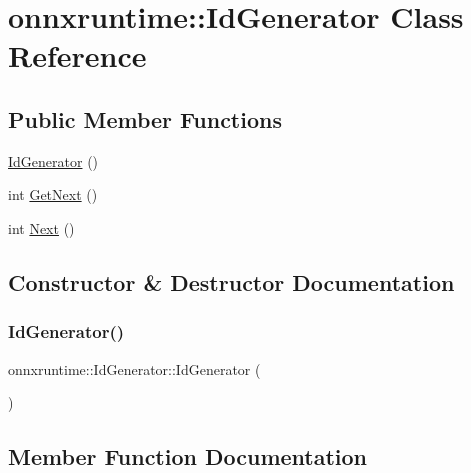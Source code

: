 \hypertarget{classonnxruntime_1_1IdGenerator}{}\section{onnxruntime\+:\+:Id\+Generator Class Reference}
\label{classonnxruntime_1_1IdGenerator}
\subsection*{Public Member Functions}
\begin{DoxyCompactItemize}
\item 
\mbox{\hyperlink{classonnxruntime_1_1IdGenerator_aabeac2f9870fd0681b0589e3dd372e02}{Id\+Generator}} ()
\item 
int \mbox{\hyperlink{classonnxruntime_1_1IdGenerator_acbb0d316a92bad0ffbf10cd3c94c9a2c}{Get\+Next}} ()
\item 
int \mbox{\hyperlink{classonnxruntime_1_1IdGenerator_ae63c5ab71bee8896bf5ebcac6dbfb08a}{Next}} ()
\end{DoxyCompactItemize}


\subsection{Constructor \& Destructor Documentation}
\mbox{\label{classonnxruntime_1_1IdGenerator_aabeac2f9870fd0681b0589e3dd372e02}} 
\subsubsection{\texorpdfstring{Id\+Generator()}{IdGenerator()}}
{\footnotesize\ttfamily onnxruntime\+::\+Id\+Generator\+::\+Id\+Generator (\begin{DoxyParamCaption}{ }\end{DoxyParamCaption})\hspace{0.3cm}{\ttfamily [inline]}}



\subsection{Member Function Documentation}
\mbox{\label{classonnxruntime_1_1IdGenerator_acbb0d316a92bad0ffbf10cd3c94c9a2c}} 
